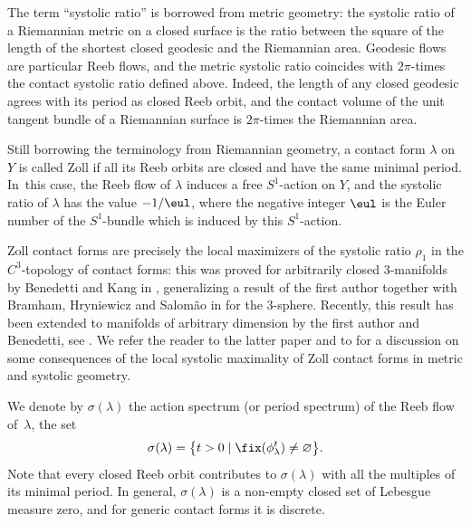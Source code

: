 The term ``systolic ratio'' is borrowed from metric geometry: the systolic ratio of a Riemannian metric on a closed surface is the ratio between the square of the length of the shortest closed geodesic and the Riemannian area. Geodesic flows are particular Reeb flows, and the metric systolic ratio coincides with $2\pi$-times the contact systolic ratio defined above. Indeed, the length of any closed geodesic agrees with its period as closed Reeb orbit, and the contact volume of the unit tangent bundle of a Riemannian surface is $2\pi$-times the Riemannian area.

Still borrowing the terminology from Riemannian geometry, a contact form $\lambda$ on~$Y$ is called Zoll if all its Reeb orbits are closed and have the same minimal period. In~this case, the Reeb flow of $\lambda$ induces a free $S^1$-action on $Y$, and the systolic ratio of $\lambda$ has the value $-1/\eul$, where the negative integer $\eul$ is the Euler number of the $S^1$-bundle which is induced by this $S^1$-action.

Zoll contact forms are precisely the local maximizers of the systolic ratio $\rho_1$ in the $C^3$-topology of contact forms: this was proved for arbitrarily closed $3$-manifolds by Benedetti and Kang in \cite{Benedetti:2021aa}, generalizing a result of the first author together with Bramham, Hryniewicz and Salom\~ao in \cite{Abbondandolo:2018fb} for the 3-sphere. Recently, this result has been extended to manifolds of arbitrary dimension by the first author and Benedetti, see \cite{Abbondandolo:2019tl}. We refer the reader to the latter paper and to \cite{Alvarez-Paiva:2014uq} for a discussion on some consequences of the local systolic maximality of Zoll contact forms in metric and systolic geometry.

We denote by $\sigma(\lambda)$ the action spectrum (or period spectrum) of the Reeb flow of~$\lambda$, \ie the set
\[
\sigma(\lambda)=\big\{t>0\mid \fix(\phi_\lambda^t)\neq\varnothing\big\}.
\]
Note that every closed Reeb orbit contributes to $\sigma(\lambda)$ with all the multiples of its minimal period. In general, $\sigma(\lambda)$ is a non-empty closed set of Lebesgue measure zero, and for generic contact forms it is discrete.

